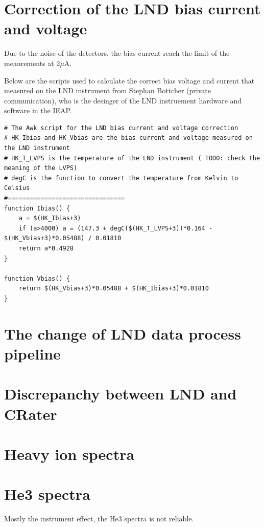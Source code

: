\section{Correction of the LND bias current and voltage}

Due to the noise of the detectors, the bias current reach the limit of the meaurements at 2$\mu$A. 

Below are the scripts used to calculate the correct bias voltage and current that measured on the LND instrument from Stephan B\¨ottcher (private communication), who is the desinger of the LND instruement hardware and software in the IEAP.
\begin{lstlisting}[float]
# The Awk script for the LND bias current and voltage correction
# HK_Ibias and HK_Vbias are the bias current and voltage measured on the LND instrument
# HK_T_LVPS is the temperature of the LND instrument ( TODO: check the meaning of the LVPS)
# degC is the function to convert the temperature from Kelvin to Celsius
#================================
function Ibias() {
    a = $(HK_Ibias+3)
    if (a>4000) a = (147.3 + degC($(HK_T_LVPS+3))*0.164 - $(HK_Vbias+3)*0.05488) / 0.01810
    return a*0.4928
}

function Vbias() {
    return $(HK_Vbias+3)*0.05488 + $(HK_Ibias+3)*0.01810
}

\end{lstlisting}



\section{The change of LND data process pipeline}
\label{chp:appendix_LND_data_process_pipeline}

\section{Discrepanchy between LND and CRater}

\section{Heavy ion spectra}

\section{He3 spectra}
\label{chp:appendix_LND_He3_spectra}
Mostly the instrument effect, the He3 spectra is not reliable.

